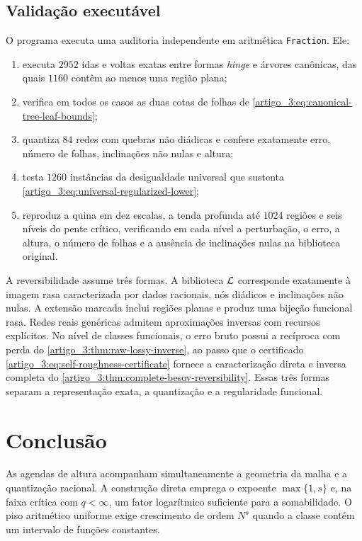 \subsection{Validação executável}

O programa  executa uma auditoria
independente em aritmética \texttt{Fraction}. Ele:
\begin{enumerate}[label=(\roman*),leftmargin=2.2em]
 \item executa $2952$ idas e voltas exatas entre formas \emph{hinge} e árvores
 canônicas, das quais $1160$ contêm ao menos uma região plana;
 \item verifica em todos os casos as duas cotas de folhas de
 \eqref{artigo_3:eq:canonical-tree-leaf-bounds};
 \item quantiza $84$ redes com quebras não diádicas e confere exatamente erro,
 número de folhas, inclinações não nulas e altura;
 \item testa $1260$ instâncias da desigualdade universal que sustenta
 \eqref{artigo_3:eq:universal-regularized-lower};
 \item reproduz a quina em dez escalas, a tenda profunda até $1024$ regiões e
 seis níveis do pente crítico, verificando em cada nível a perturbação, o erro,
 a altura, o número de folhas e a ausência de inclinações nulas na biblioteca
 original.
\end{enumerate}

A reversibilidade assume três formas. A biblioteca $\mathcal{L}$ corresponde
exatamente à imagem rasa caracterizada por dados racionais, nós diádicos e
inclinações não nulas. A extensão marcada inclui regiões planas e produz uma
bijeção funcional rasa. Redes reais genéricas admitem aproximações inversas
com recursos explícitos. No nível de classes funcionais, o erro bruto possui a recíproca com perda do
\cref{artigo_3:thm:raw-lossy-inverse}, ao passo que o certificado
\eqref{artigo_3:eq:self-roughness-certificate} fornece a caracterização direta e
inversa completa do \cref{artigo_3:thm:complete-besov-reversibility}. Essas três formas
separam a representação exata, a quantização e a regularidade funcional.
\section{Conclusão}
As agendas de altura acompanham simultaneamente a geometria da malha e a quantização racional. A construção direta emprega o expoente $\max\{1,s\}$ e, na faixa crítica com $q<\infty$, um fator logarítmico suficiente para a somabilidade. O piso aritmético uniforme exige crescimento de ordem $N^s$ quando a classe contém um intervalo de funções constantes.

